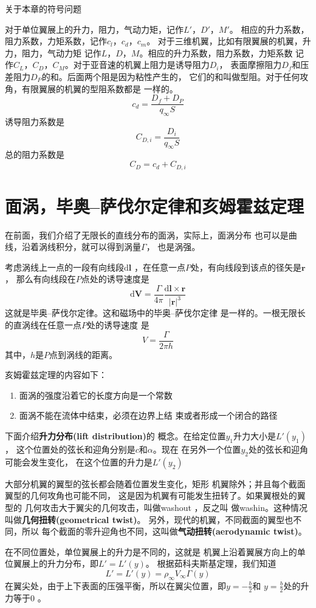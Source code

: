\begin{notice}
关于本章的符号问题

对于单位翼展上的升力，阻力，气动力矩，记作$L'$，$D'$，$M'$。
相应的升力系数，阻力系数，力矩系数，记作$c_l$，$c_d$，$c_m$。
对于三维机翼，比如有限翼展的机翼，升力，阻力，气动力矩
记作$L$，$D$，$M$。相应的升力系数，阻力系数，力矩系数
记作$C_L$，$C_D$，$C_M$。对于亚音速的机翼上阻力是诱导阻力$D_i$，
表面摩擦阻力$D_f$和压差阻力$D_P$的和。后面两个阻是因为粘性产生的，
它们的和叫做型阻。对于任何攻角，有限翼展的机翼的型阻系数都是
一样的。
\[
 c_d=\frac{D_f+D_P}{q_\infty S} 
\]
诱导阻力系数是
\[
  C_{D,i}=\frac{D_i}{q_\infty S}
\]
总的阻力系数是
\[
  C_D=c_d+C_{D,i}
\]
\end{notice}

\section{面涡，毕奥--萨伐尔定律和亥姆霍兹定理}
在前面，我们介绍了无限长的直线分布的面涡，实际上，面涡分布
也可以是曲线，沿着涡线积分，就可以得到涡量$\Gamma$，
也是涡强。

考虑涡线上一点的一段有向线段$\mathrm{d}\mathbf{l}$
，在任意一点$P$处，有向线段到该点的径矢是$\mathbf{r}$，
那么有向线段在$P$点处的诱导速度是
\[
  \mathrm{d}\mathbf{V}=\frac{\Gamma}{4 \pi}
  \frac{\mathrm{d}\mathbf{l}\times \mathbf{r}}{\lvert \mathbf{r}\rvert ^3}
\]
这就是毕奥--萨伐尔定律。这和磁场中的毕奥--萨伐尔定律
是一样的。一根无限长的直涡线在任意一点$P$处的诱导速度
是
\[
  V=\frac{\Gamma}{2 \pi h }
\]
其中，$h$是$P$点到涡线的距离。

亥姆霍兹定理的内容如下：
\begin{enumerate}
  \item 面涡的强度沿着它的长度方向是一个常数
  \item 面涡不能在流体中结束，必须在边界上结
    束或者形成一个闭合的路径
\end{enumerate}

下面介绍{\bfseries 升力分布(lift distribution)}的
概念。在给定位置$y_1$升力大小是$L'\left(y_1\right) $，
这个位置处的弦长和迎角分别是$c$和$\alpha$。现在
在另外一个位置$y_2$处的弦长和迎角可能会发生变化，
在这个位置的升力是$L'\left(y_2\right) $ 
\begin{notice}
大部分机翼的翼型的弦长都会随着位置发生变化，矩形
机翼除外；并且每个截面翼型的几何攻角也可能不同，
这是因为机翼有可能发生扭转了。如果翼根处的翼型的
几何攻击大于翼尖的几何攻击，叫做washout ，反之叫
做washin。这种情况叫做{\bfseries 几何扭转(geometrical twist)}。
另外，现代的机翼，不同截面的翼型也不同，所以
每个截面的零升迎角也不同，这叫做{\bfseries 气动扭转(aerodynamic twist)}。
\end{notice}
在不同位置处，单位翼展上的升力是不同的，这就是
机翼上沿着翼展方向上的单位翼展上的升力分布，即$L'=L'(y)$。
根据茹科夫斯基定理，我们知道
\[
  L'=L'(y)=\rho_\infty V_\infty \Gamma(y)
\]
在翼尖处，由于上下表面的压强平衡，所以在翼尖位置，即$y=-\frac{b}{2 }$和
$y= \frac{b}{2}$处的升力等于0 。

